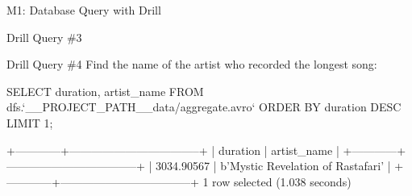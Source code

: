 \documentclass{beamer}
\begin{document}
\begin{section}{M1: Database Query with Drill}
\begin{frame}[fragile]{Drill Query \#3}
        
    \end{frame}
    \begin{frame}[fragile]{Drill Query \#4}
        Find the name of the artist who recorded the longest song:
    \begin{mycodesql}
SELECT
  duration,
  artist_name
FROM dfs.`__PROJECT_PATH__data/aggregate.avro`
ORDER BY
  duration DESC
LIMIT 1;
    \end{mycodesql}
    \begin{bashcode}
+------------+-----------------------------------+
|  duration  |            artist_name            |
+------------+-----------------------------------+
| 3034.90567 | b'Mystic Revelation of Rastafari' |
+------------+-----------------------------------+
1 row selected (1.038 seconds)
    \end{bashcode}
        
    \end{frame}
\end{section}
\end{document}
